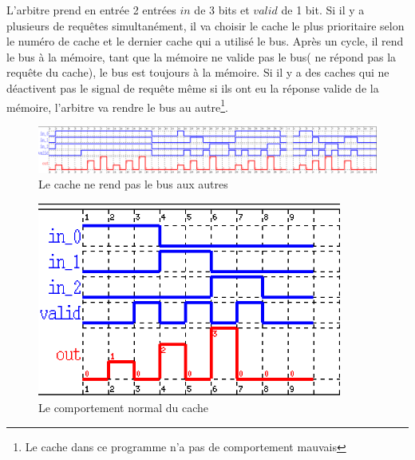 \documentclass[a4paper,11pt]{report}
\begin{document}
	L'arbitre prend en entrée 2 entrées $in$ de 3 bits et $valid$ de 1 bit. Si il y a plusieurs de requêtes simultanément, il va choisir le cache le plus prioritaire selon le numéro de cache et le dernier cache qui a utilisé le bus. Après un cycle, il rend le bus à la mémoire, tant que la mémoire ne valide pas le bus( ne répond pas la requête du cache), le bus est toujours à la mémoire. Si il y a des caches qui ne déactivent pas le signal de requête même si ils ont eu la réponse valide de la mémoire, l'arbitre va rendre le bus au autre\footnote{Le cache dans ce programme n'a pas de comportement mauvais}.	
	
	\begin{figure}[!htbp]
		\includegraphics[width = 16cm]{arb_diag_1.png}
		\caption{Le cache ne rend pas le bus aux autres}
	\end{figure}
	
	\begin{figure}[!htbp]
		\centering
		\includegraphics[width = 10cm]{arb_diag_2.png}
		\caption{Le comportement normal du cache}
	\end{figure}
	
\end{document}
